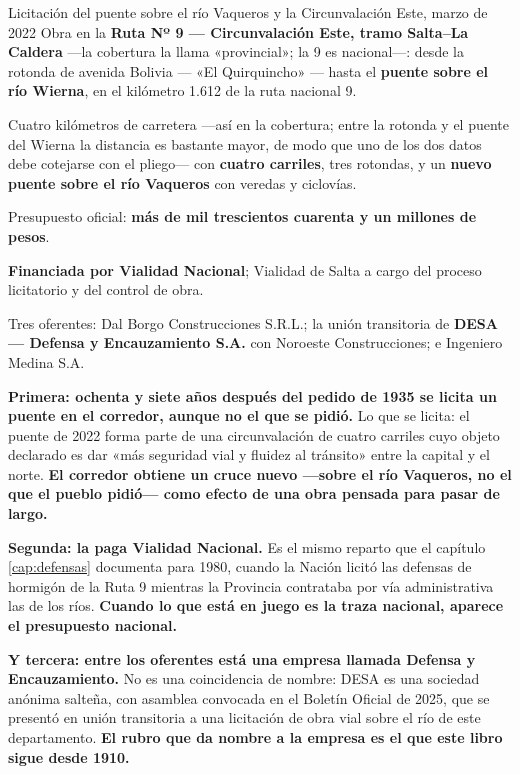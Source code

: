 \begin{ficha}{Licitación del puente sobre el río Vaqueros y la Circunvalación Este, marzo de 2022}
Obra en la \textbf{Ruta Nº 9 --- Circunvalación Este, tramo Salta--La Caldera} ---la cobertura la llama «provincial»; la 9 es nacional---:
desde la rotonda de avenida Bolivia --- «El Quirquincho» --- hasta el \textbf{puente sobre el
río Wierna}, en el kilómetro 1.612 de la ruta nacional 9.

Cuatro kilómetros de carretera ---así en la cobertura; entre la rotonda y el puente del Wierna la distancia es bastante mayor, de modo que uno de los dos datos debe cotejarse con el pliego--- con \textbf{cuatro carriles}, tres rotondas, y un
\textbf{nuevo puente sobre el río Vaqueros} con veredas y ciclovías.

Presupuesto oficial: \textbf{más de mil trescientos cuarenta y un millones de pesos}.

\textbf{Financiada por Vialidad Nacional}; Vialidad de Salta a cargo del proceso licitatorio
y del control de obra.

Tres oferentes: Dal Borgo Construcciones S.R.L.; la unión transitoria de \textbf{DESA --- Defensa
y Encauzamiento S.A.} con Noroeste Construcciones; e Ingeniero Medina S.A.
\end{ficha}

\textbf{Primera: ochenta y siete años después del pedido de 1935 se licita un puente en el corredor, aunque no el que se pidió.} Lo que se licita: el puente de 2022 forma parte de una circunvalación de
cuatro carriles cuyo objeto declarado es dar «más seguridad vial y fluidez al tránsito» entre
la capital y el norte. \textbf{El corredor obtiene un cruce nuevo ---sobre el río Vaqueros, no el que el pueblo pidió--- como efecto de una obra pensada para pasar de largo.}

\textbf{Segunda: la paga Vialidad Nacional.} Es el mismo reparto que el capítulo \ref{cap:defensas} documenta
para 1980, cuando la Nación licitó las defensas de hormigón de la Ruta 9 mientras la Provincia
contrataba por vía administrativa las de los ríos. \textbf{Cuando lo que está en juego es la
traza nacional, aparece el presupuesto nacional.}

\textbf{Y tercera: entre los oferentes está una empresa llamada Defensa y Encauzamiento.} No
es una coincidencia de nombre: DESA es una sociedad anónima salteña, con asamblea convocada
en el Boletín Oficial de 2025, que se presentó en unión transitoria a una licitación de obra
vial sobre el río de este departamento. \textbf{El rubro que da nombre a la empresa es el que
este libro sigue desde 1910.}

